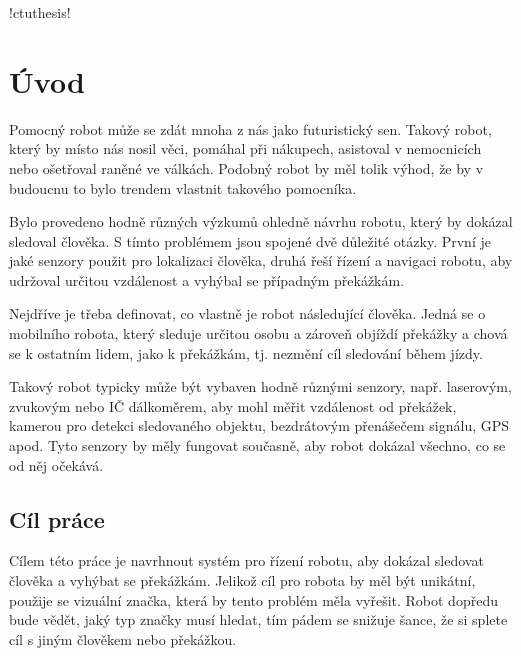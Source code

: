 \documentclass[twoside]{ctuthesis}
\theoremstyle{plain}
\theoremstyle{definition}
\theoremstyle{note}
\begin{document}
	


\renewcommand \ctulstsep {0pt}

\newcommand\ctuclsname{\leavevmode\unhcopy\ctuclsnamebox}
\newsavebox\ctuclsnamebox
\begin{lrbox}{\ctuclsnamebox}
\ctulst!ctuthesis!
\end{lrbox}

\maketitle

\chapter{Úvod}

Pomocný robot může se zdát mnoha z nás jako futuristický sen. Takový robot, který by místo nás nosil věci, pomáhal při nákupech, asistoval v nemocnicích nebo ošetřoval raněné ve válkách. Podobný robot by měl tolik výhod, že by v budoucnu to bylo trendem vlastnit takového pomocníka.

Bylo provedeno hodně různých výzkumů ohledně návrhu robotu, který by dokázal sledoval člověka. S tímto problémem jsou spojené dvě důležité otázky. První je jaké senzory použit pro lokalizaci člověka, druhá řeší řízení a navigaci robotu, aby udržoval určitou vzdálenost a vyhýbal se případným překážkám.

Nejdříve je třeba definovat, co vlastně je robot následující člověka. Jedná se o mobilního robota, který sleduje určitou osobu
a zároveň objíždí překážky a chová se k ostatním lidem, jako k překážkám, tj. nezmění cíl sledování během jízdy.

Takový robot typicky může být vybaven hodně různými senzory, např. laserovým, zvukovým nebo IČ dálkoměrem, aby mohl měřit vzdálenost od překážek, kamerou pro detekci sledovaného objektu, bezdrátovým přenášečem signálu, GPS apod. Tyto senzory by měly fungovat současně, aby robot dokázal všechno, co se od něj očekává. 

\section{Cíl práce}
Cílem této práce je navrhnout systém pro řízení robotu, aby dokázal sledovat člověka a vyhýbat se překážkám. Jelikož cíl pro robota by měl být unikátní, použije se vizuální značka, která by tento problém měla vyřešit. Robot dopředu bude vědět, jaký typ značky musí hledat, tím pádem se snižuje šance, že si splete cíl s jiným člověkem nebo překážkou.
\end{document}
